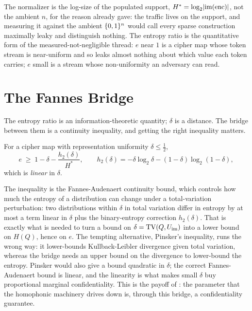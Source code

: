 The normalizer is the log-size of the populated support, $H^{*} =
\log_2\lvert\mathrm{im}(\operatorname{enc})\rvert$, not the ambient $n$, for the reason
 already gave: the traffic lives on the support, and
measuring it against the ambient $\{0,1\}^n$ would call every sparse construction
maximally leaky and distinguish nothing. The entropy ratio is the
quantitative form of the measured-not-negligible thread: $e$ near $1$ is a
cipher map whose token stream is near-uniform and so leaks almost nothing
about which value each token carries; $e$ small is a stream whose
non-uniformity an adversary can read.

\section{The Fannes Bridge}
\label{sec:fannes-bridge}

The entropy ratio is an information-theoretic quantity; $\delta$ is a
distance. The bridge between them is a continuity inequality, and getting
the right inequality matters.

\begin{proposition}
\label{prop:fannes}
For a cipher map with representation uniformity $\delta \le \tfrac12$,
\[
  e \;\geq\; 1 - \delta - \frac{h_2(\delta)}{H^{*}},
  \qquad h_2(\delta) = -\delta\log_2\delta - (1-\delta)\log_2(1-\delta),
\]
which is \emph{linear} in $\delta$.
\end{proposition}

The inequality is the Fannes-Audenaert continuity bound, which controls how
much the entropy of a distribution can change under a total-variation
perturbation: two distributions within $\delta$ in total variation differ in
entropy by at most a term linear in $\delta$ plus the binary-entropy
correction $h_2(\delta)$. That is exactly what is needed to turn a bound on
$\delta = \operatorname{TV}(Q, U_{\mathrm{im}})$ into a lower bound on $H(Q)$, hence on
$e$. The tempting alternative, Pinsker's inequality, runs the wrong way: it
lower-bounds Kullback-Leibler divergence given total variation, whereas the
bridge needs an upper bound on the divergence to lower-bound the entropy.
Pinsker would also give a bound quadratic in $\delta$; the correct
Fannes-Audenaert bound is linear, and the linearity is what makes small
$\delta$ buy proportional marginal confidentiality. This is the payoff of
: the parameter that the homophonic machinery drives
down is, through this bridge, a confidentiality guarantee.

